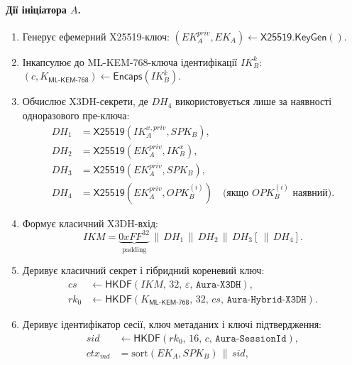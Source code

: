 \documentclass[11pt,a4paper]{article}
\theoremstyle{definition}
\newcommand{\HKDF}{\textsf{HKDF}}
\renewcommand{\DH}{\textsf{X25519}}
\newcommand{\KEM}{\textsf{ML-KEM-768}}
\newcommand{\KeyGen}{\textsf{KeyGen}}
\newcommand{\Encaps}{\textsf{Encaps}}
\newcommand{\concat}{\ensuremath{\,\|\,}}
\newcommand{\rk}{\ensuremath{\mathit{rk}}}
\newcommand{\IK}{\ensuremath{\mathit{IK}}}
\newcommand{\SPK}{\ensuremath{\mathit{SPK}}}
\newcommand{\EK}{\ensuremath{\mathit{EK}}}
\newcommand{\OPK}{\ensuremath{\mathit{OPK}}}
\begin{document}
\paragraph{Дії ініціатора $A$.}
\begin{enumerate}
  \item Генерує ефемерний \DH{}-ключ: $(\EK_A^{\mathit{priv}}, \EK_A) \gets \DH.\KeyGen()$.
  \item Інкапсулює до \KEM{}-ключа ідентифікації $\IK_B^k$:
    $(c, K_{\KEM}) \gets \Encaps(\IK_B^k)$.
  \item Обчислює X3DH-секрети, де $\mathit{DH}_4$ використовується лише
    за наявності одноразового пре-ключа:
    \begin{align}
      \mathit{DH}_1 &= \DH(\IK_A^{x,\mathit{priv}}, \SPK_B), \label{eq:x3dh-dh1}\\
      \mathit{DH}_2 &= \DH(\EK_A^{\mathit{priv}}, \IK_B^x), \label{eq:x3dh-dh2}\\
      \mathit{DH}_3 &= \DH(\EK_A^{\mathit{priv}}, \SPK_B), \label{eq:x3dh-dh3}\\
      \mathit{DH}_4 &= \DH(\EK_A^{\mathit{priv}}, \OPK_B^{(i)})
        \quad\text{(якщо $\OPK_B^{(i)}$ наявний).} \label{eq:x3dh-dh4}
    \end{align}
  \item Формує класичний X3DH-вхід:
    \begin{equation}\label{eq:hybrid-ikm}
      \mathit{IKM} = \underbrace{\mathit{0xFF}^{32}}_{\text{padding}}
      \concat \mathit{DH}_1 \concat \mathit{DH}_2 \concat \mathit{DH}_3
      [\concat \mathit{DH}_4].
    \end{equation}
  \item Деривує класичний секрет і гібридний кореневий ключ:
    \begin{align}
      \mathit{cs}
      &\gets \HKDF(\mathit{IKM},\,32,\,\varepsilon,\,
        \texttt{Aura-X3DH}), \label{eq:x3dh-classical-secret}\\
      \rk_0
      &\gets \HKDF(K_{\KEM},\,32,\,\mathit{cs},\,
        \texttt{Aura-Hybrid-X3DH}). \label{eq:hybrid-derive}
    \end{align}
  \item Деривує ідентифікатор сесії, ключ метаданих і ключі підтвердження:
    \begin{align}
      \mathit{sid} &\gets \HKDF(\rk_0,\,16,\,c,\,
        \texttt{Aura-SessionId}),\\
      \mathit{ctx}_{md} &= \mathrm{sort}(\EK_A,\SPK_B)\concat \mathit{sid},\\

\end{align}
\end{enumerate}
\end{document}
